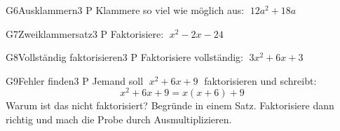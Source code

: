 \documentclass[11pt]{article}
\begin{document}

\begin{lpaufgabe}{G6}{Ausklammern}{3 P}
Klammere so viel wie möglich aus: $\;12a^2 + 18a$
\end{lpaufgabe}

\begin{lpaufgabe}{G7}{Zweiklammersatz}{3 P}
Faktorisiere: $\;x^2 - 2x - 24$
\end{lpaufgabe}

\begin{lpaufgabe}{G8}{Vollständig faktorisieren}{3 P}
Faktorisiere vollständig: $\;3x^2 + 6x + 3$
\end{lpaufgabe}

\begin{lpaufgabe}{G9}{Fehler finden}{3 P}
Jemand soll $\;x^2 + 6x + 9\;$ faktorisieren und schreibt:
\[ x^2 + 6x + 9 = x(x + 6) + 9 \]
Warum ist das nicht faktorisiert? Begründe in einem Satz. Faktorisiere dann richtig und mach die Probe durch Ausmultiplizieren.
\end{lpaufgabe}
\end{document}
